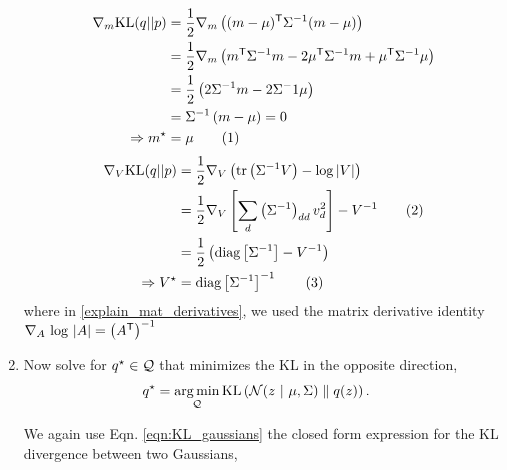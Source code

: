 \documentclass[11pt]{article}
\newcommand{\inv}{{-1}}
\newcommand{\numberthis}{\addtocounter{equation}{1}\tag{\theequation}}
\begin{document}
\begin{enumerate}[label=(\alph*)]
\begin{solution}
    \begin{align*}
       \nabla_m \textrm{KL}(q||p)
            &= \frac{1}{2} \nabla_m \left( (m - \mu)^\trans \Sigma^\inv (m - \mu) \right) \\
            &= \frac{1}{2} \nabla_m \left( m^\trans\Sigma^\inv m - 2 \mu^\trans \Sigma^\inv m +  \mu^\trans\Sigma^\inv \mu \right) \\
            &= \frac{1}{2} \left( 2 \Sigma^\inv m - 2 \Sigma^-1 \mu\right) \\
            &= \Sigma^\inv\left(m - \mu \right) = 0 \\
        \Rightarrow m^\star &= \mu \numberthis \\
    \end{align*}
    \begin{align*}
        \nabla_V \textrm{KL}(q||p)
            &= \frac{1}{2} \nabla_V \left( \textrm{tr} \left(\Sigma^\inv V \right) - \log |V|\right) \\
            &= \frac{1}{2} \nabla_V \left[\sum_d \left(\Sigma^\inv \right)_{dd} v_d^2\right] - V^\inv
                \numberthis\label{explain_mat_derivatives} \\
            &= \frac{1}{2} \left(\textrm{diag}\left[\Sigma^\inv\right] - V^\inv \right)
                \\
        \Rightarrow V^\star &= \textrm{diag}\left[\Sigma^\inv\right]^\inv \numberthis
    \end{align*}
    where in \eqref{explain_mat_derivatives}, we used the matrix derivative identity
    $ \nabla_A \, \log\, |A| = \left(A^\trans\right)^\inv$

    \end{solution}
    
    


    \item Now solve for $q^\star \in \mathcal{Q}$ that minimizes the KL in the opposite direction,
    \begin{align*}
        q^\star &= \operatorname*{arg\,min}_{\mathcal{Q}} \textrm{KL}\left(\mathcal{N}(z ~\vert~ \mu, \Sigma)\;\|\;q(z)\right).
    \end{align*}
    
    \begin{solution}
    We again use Eqn. \eqref{eqn:KL_gaussians} the closed form expression for the KL divergence between two Gaussians,


\end{solution}
\end{enumerate}
\end{document}
